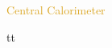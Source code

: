

\begin{frame}{\textcolor{Goldenrod}{Central Calorimeter}}

  \itt[<+->]
  \item tt
  \tti
\end{frame}



